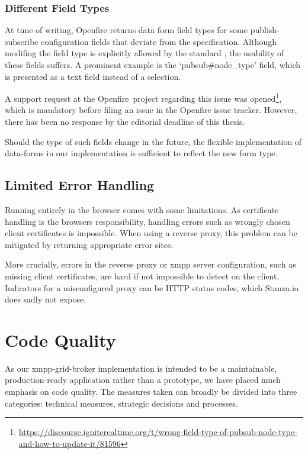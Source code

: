 \subsubsection{Different Field Types}

At time of writing, Openfire returns data form field types for some \gls{publish-subscribe} configuration fields that deviate from the specification.
Although modifing the field type is explicitly allowed by the standard \cite{xep-0060}, the usability of these fields suffers.
A prominent example is the `pubsub\#node\_type' field, which is presented as a text field instead of a selection.

A support request at the Openfire~project regarding this issue was opened\footnote{\url{https://discourse.igniterealtime.org/t/wrong-field-type-of-pubsub-node-type-and-how-to-update-it/81596}},
which is mandatory before filing an issue in the Openfire issue tracker.
However, there has been no response by the editorial deadline of this thesis.

Should the type of such fields change in the future, the flexible implementation of \gls{data-forms} in our implementation is sufficient to reflect the new form type.

\subsection{Limited Error Handling}

Running entirely in the browser comes with some limitations. As certificate handling is the browsers responsibility, handling errors such as wrongly chosen client certificates is impossible. When using a reverse proxy, this problem can be mitigated by returning appropriate error sites.

More crucially, errors in the reverse proxy or \gls{xmpp} server configuration, such as missing client certificates, are hard if not impossible to detect on the client. Indicators for a misconfigured proxy can be HTTP status codes, which Stanza.io does sadly not expose.

\section{Code Quality}
As our \gls{xmpp-grid-broker} implementation is intended to be a maintainable, production-ready application rather than a prototype, we have placed much emphasis on code quality.
The measures taken can broadly be divided into three categories: technical measures, strategic decisions and processes.

